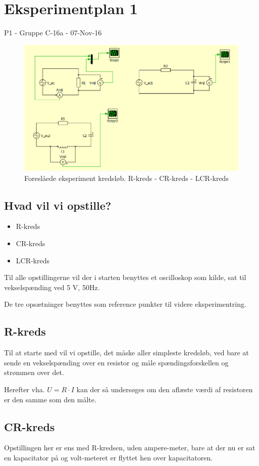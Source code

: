 \chapter{Eksperimentplan 1}

P1 - Gruppe C-16a - 07-Nov-16

\begin{figure}[htbp]
\centering
\includegraphics[width=1\textwidth]{Vildledning/Schematics/Eks1_LCR.png}
\caption{Foreslåede eksperiment kredsløb. R-kreds - CR-kreds - LCR-kreds}
\label{fig:Eks1}
\end{figure}
\newpage

\section{Hvad vil vi opstille?}
\begin{itemize}
\item R-kreds
\item CR-kreds
\item LCR-kreds
\end{itemize}
Til alle opstillingerne vil der i starten benyttes et oscilloskop som kilde, sat til vekselspænding ved 5 V, 50Hz.

De tre opsætninger benyttes som reference punkter til videre eksperimentring.  
\section{R-kreds}
Til at starte med vil vi opstille, det måske aller simpleste kredsløb, ved bare at sende en vekselspænding over en resistor og måle spændingsforskellen og strømmen over det.

Herefter vha. $U=R\cdot I$ kan der så undersøges om den aflæste værdi af resistoren er den samme som den målte.
\section{CR-kreds}
Opstillingen her er ens med R-kredsen, uden ampere-meter, bare at der nu er sat en kapacitator på og volt-meteret er flyttet hen over kapacitatoren.

